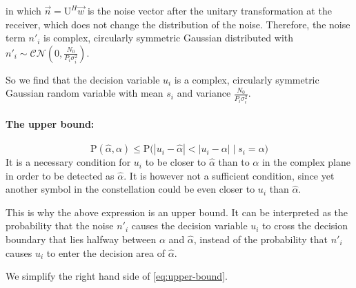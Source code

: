 \documentclass[a4paper,12pt]{article}
\begin{document}
\noindent in which $ \vec{n} = \mathrm{U}^{H} \vec{w} $ is the noise vector after the unitary transformation at the receiver, which does not change the distribution of the noise. Therefore, the noise term $ n'_i $ is complex, circularly symmetric Gaussian distributed with $ n'_i \sim \mathcal{CN}(0, \frac{N_0}{P_i \sigma^{2}_i}) $. 

\noindent So we find that the decision variable $ u_i $ is a complex, circularly symmetric Gaussian random variable with mean $ s_i $ and variance $ \frac{N_0}{P_i \sigma^{2}_i} $.

\paragraph{The upper bound:}
\begin{equation}
    \mathrm{P}(\hat{\alpha}, \alpha) \leq \mathrm{P}\Big( |u_i - \hat{\alpha}| < |u_i - \alpha| \;\big|\; s_i = \alpha \Big) \label{eq:upper-bound}
\end{equation}
It is a necessary condition for $ u_i $ to be closer to $ \hat{\alpha} $ than to $ \alpha $ in the complex plane in order to be detected as $\hat{\alpha}$.
It is however not a sufficient condition, since yet another symbol in the constellation could be even closer to $ u_i $ than $ \hat{\alpha} $. \smallskip

\noindent This is why the above expression is an upper bound. It can be interpreted as the probability that the noise $ n'_i $ causes the decision variable $ u_i $ to cross the decision boundary that lies halfway between $ \alpha $ and $ \hat{\alpha} $, instead of the probability that $ n'_i $ causes $ u_i $ to enter the  decision area of $ \hat{\alpha} $. \bigskip

\noindent We simplify the right hand side of \autoref{eq:upper-bound}.
\end{document}
